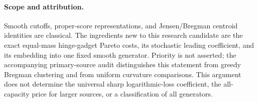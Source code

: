 \paragraph{Scope and attribution.}
Smooth cutoffs, proper-score representations, and Jensen/Bregman
centroid identities are classical.  The ingredients new to this research
candidate are the exact equal-mass hinge-gadget Pareto costs, its
stochastic leading coefficient, and its embedding into one fixed smooth
generator.  Priority is not asserted; the accompanying primary-source
audit distinguishes this statement from greedy Bregman clustering and
from uniform curvature comparisons.  This argument does not determine
the universal sharp logarithmic-loss coefficient, the all-capacity
price for larger sources, or a classification of all generators.
